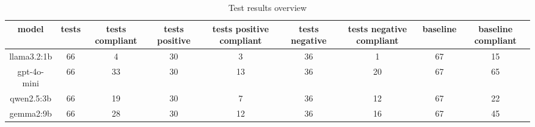 
  \begin{table}[h!]
  \centering
  \begin{tabular}{|c|c|c|c|c|c|c|c|c|}
  \hline
  model & tests & tests compliant & tests positive & tests positive compliant & tests negative & tests negative compliant & baseline & baseline compliant \\
  \hline
  llama3.2:1b & 66 & 4 & 30 & 3 & 36 & 1 & 67 & 15\\
\hline
gpt-4o-mini & 66 & 33 & 30 & 13 & 36 & 20 & 67 & 65\\
\hline
qwen2.5:3b & 66 & 19 & 30 & 7 & 36 & 12 & 67 & 22\\
\hline
gemma2:9b & 66 & 28 & 30 & 12 & 36 & 16 & 67 & 45
  \end{tabular}
  \caption{Test results overview}
  
  \end{table}
  